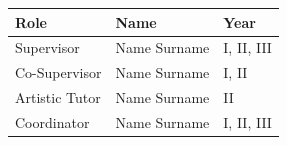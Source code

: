 \vspace*{\fill}
\begin{table}[b]  %
    \centering
    \begin{tabular}{lll}
        \toprule
        Role & Name & Year \\
        \midrule
        Supervisor      & Name Surname & I, II, III \\
        Co-Supervisor   & Name Surname & I, II \\
        Artistic Tutor  & Name Surname & II \\
        Coordinator     & Name Surname & I, II, III \\
        \bottomrule
    \end{tabular}
\end{table}

